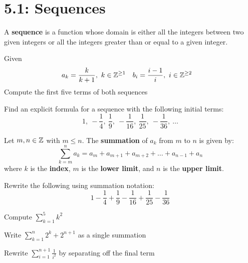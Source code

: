 \documentclass[../mathNotesPreamble]{subfiles}
\providecommand{\relscalefact}{1.4}
\begin{document}
\relscale{\relscalefact}
  \section{5.1: Sequences}
  \begin{defn*}
    A \textbf{sequence} is a function whose domain is either all the integers between two given integers or all the integers greater than or equal to a given integer.
  \end{defn*}
  \begin{ex*}
    Given
      \begin{align*}
        a_k&=\frac{k}{k+1},\ k\in \mathbb{Z}^{\geq 1}&
        b_i&=\frac{i-1}{i},\ i\in \mathbb{Z}^{\geq 2}
      \end{align*}
    Compute the first five terms of both sequences
  \end{ex*}
  \pagebreak

  \begin{ex*}
    Find an explicit formula for a sequence with the following initial terms:
      \[1,\ -\frac{1}{4},\ \frac{1}{9},\ -\frac{1}{16},\ \frac{1}{25},\ -\frac{1}{36},\ \dots\]
  \end{ex*}
  \begin{defn*}
    Let $m,n\in \mathbb{Z}$ with $m\leq n$. The \textbf{summation} of $a_k$ from $m$ to $n$ is given by:
      \[\sum_{k=m}^n a_k= a_m+a_{m+1}+a_{m+2}+\dots+a_{n-1}+a_n\]
    where $k$ is the \textbf{index}, $m$ is the \textbf{lower limit}, and $n$ is the \textbf{upper limit}.
  \end{defn*}
  \begin{ex*}
    Rewrite the following using summation notation:
      \[1-\frac{1}{4}+\frac{1}{9}-\frac{1}{16}+\frac{1}{25}-\frac{1}{36}\]
  \end{ex*}
  \pagebreak

  \begin{ex*}
    Compute $\displaystyle \sum_{k=1}^5 k^2$
  \end{ex*}
  \begin{ex*}
    Write $\displaystyle \sum_{k=1}^n 2^k+2^{n+1}$ as a single summation
  \end{ex*}
  \pagebreak

  \begin{ex*}
    Rewrite $\displaystyle \sum_{i=1}^{n+1} \frac{1}{i^2}$ by separating off the final term
  \end{ex*}
\end{document}

